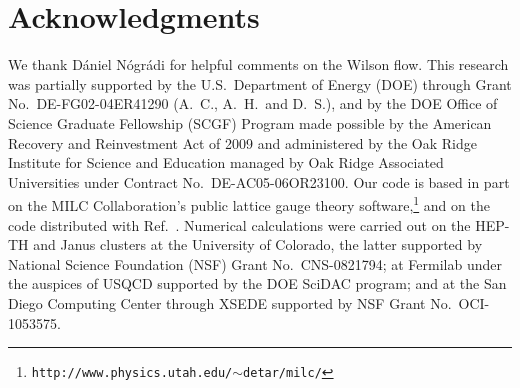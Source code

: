 \documentclass{PoS}
\newcommand{\refcite}[1]{Ref.~\cite{#1}}
\begin{document}
\section*{Acknowledgments} %
We thank D\'aniel N\'ogr\'adi for helpful comments on the Wilson flow.
This research was partially supported by the U.S.~Department of Energy (DOE) through Grant No.~DE-FG02-04ER41290 (A.~C., A.~H.\ and D.~S.), and by the DOE Office of Science Graduate Fellowship (SCGF) Program made possible by the American Recovery and Reinvestment Act of 2009 and administered by the Oak Ridge Institute for Science and Education managed by Oak Ridge Associated Universities under Contract No.~DE-AC05-06OR23100.
Our code is based in part on the MILC Collaboration's public lattice gauge theory software,\footnote{\texttt{http://www.physics.utah.edu/$\sim$detar/milc/}} and on the code distributed with \refcite{Borsanyi:2012zs}.
Numerical calculations were carried out on the HEP-TH and Janus clusters at the University of Colorado, the latter supported by National Science Foundation (NSF) Grant No.~CNS-0821794; at Fermilab under the auspices of USQCD supported by the DOE SciDAC program; and at the San Diego Computing Center through XSEDE supported by NSF Grant No.~OCI-1053575.



\end{document}
